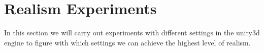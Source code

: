 \section{Realism Experiments}

In this section we will carry out experiments with different settings in the unity3d engine to figure with which settings we can achieve the highest level of realism.

